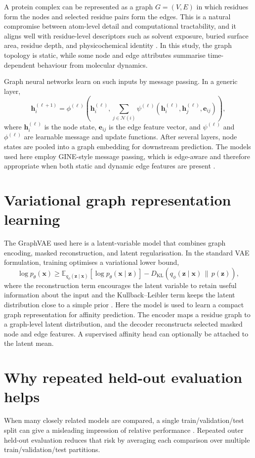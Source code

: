 A protein complex can be represented as a graph $G=(V,E)$ in which residues form the nodes and selected residue pairs form the edges. This is a natural compromise between atom-level detail and computational tractability, and it aligns well with residue-level descriptors such as solvent exposure, buried surface area, residue depth, and physicochemical identity \citep{Crocioni2024DeepRank2}. In this study, the graph topology is static, while some node and edge attributes summarise time-dependent behaviour from molecular dynamics.

Graph neural networks learn on such inputs by message passing. In a generic layer,
\begin{equation}
\mathbf{h}_i^{(\ell+1)}
=
\phi^{(\ell)}
\left(
\mathbf{h}_i^{(\ell)},
\sum_{j \in \mathcal{N}(i)}
\psi^{(\ell)}\left(\mathbf{h}_i^{(\ell)}, \mathbf{h}_j^{(\ell)}, \mathbf{e}_{ij}\right)
\right),
\end{equation}
where $\mathbf{h}_i^{(\ell)}$ is the node state, $\mathbf{e}_{ij}$ is the edge feature vector, and $\psi^{(\ell)}$ and $\phi^{(\ell)}$ are learnable message and update functions. After several layers, node states are pooled into a graph embedding for downstream prediction. The models used here employ GINE-style message passing, which is edge-aware and therefore appropriate when both static and dynamic edge features are present \citep{Xu2019GIN,Hu2020Pretraining}.

\section{Variational graph representation learning}

The GraphVAE used here is a latent-variable model that combines graph encoding, masked reconstruction, and latent regularisation. In the standard VAE formulation, training optimises a variational lower bound,
\begin{equation}
\log p_{\theta}(\mathbf{x})
\ge
\mathbb{E}_{q_{\phi}(\mathbf{z}\mid \mathbf{x})}
\left[
\log p_{\theta}(\mathbf{x}\mid \mathbf{z})
\right]
-
D_{\mathrm{KL}}\!\left(q_{\phi}(\mathbf{z}\mid \mathbf{x}) \,\|\, p(\mathbf{z})\right),
\end{equation}
where the reconstruction term encourages the latent variable to retain useful information about the input and the Kullback--Leibler term keeps the latent distribution close to a simple prior \citep{Kingma2014VAE}. Here the model is used to learn a compact graph representation for affinity prediction. The encoder maps a residue graph to a graph-level latent distribution, and the decoder reconstructs selected masked node and edge features. A supervised affinity head can optionally be attached to the latent mean.

\section{Why repeated held-out evaluation helps}

When many closely related models are compared, a single train/validation/test split can give a misleading impression of relative performance \citep{Kohavi1995CV}. Repeated outer held-out evaluation reduces that risk by averaging each comparison over multiple train/validation/test partitions.

